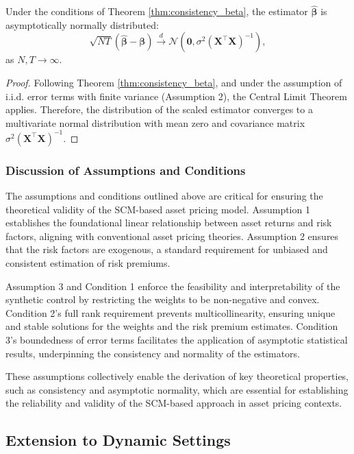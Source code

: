 \begin{corollary}
\label{cor:asymptotic_normality}
Under the conditions of Theorem \ref{thm:consistency_beta}, the estimator $\hat{\boldsymbol{\beta}}$ is asymptotically normally distributed:
\[
\sqrt{NT} (\hat{\boldsymbol{\beta}} - \boldsymbol{\beta}) \xrightarrow{d} \mathcal{N}(\mathbf{0}, \sigma^2 (\mathbf{X}^\top \mathbf{X})^{-1}),
\]
as $N, T \rightarrow \infty$.
\end{corollary}

\begin{proof}
Following Theorem \ref{thm:consistency_beta}, and under the assumption of i.i.d. error terms with finite variance (Assumption 2), the Central Limit Theorem applies. Therefore, the distribution of the scaled estimator converges to a multivariate normal distribution with mean zero and covariance matrix $\sigma^2 (\mathbf{X}^\top \mathbf{X})^{-1}$.
\end{proof}

\subsubsection{Discussion of Assumptions and Conditions}

The assumptions and conditions outlined above are critical for ensuring the theoretical validity of the SCM-based asset pricing model. Assumption 1 establishes the foundational linear relationship between asset returns and risk factors, aligning with conventional asset pricing theories. Assumption 2 ensures that the risk factors are exogenous, a standard requirement for unbiased and consistent estimation of risk premiums.

Assumption 3 and Condition 1 enforce the feasibility and interpretability of the synthetic control by restricting the weights to be non-negative and convex. Condition 2's full rank requirement prevents multicollinearity, ensuring unique and stable solutions for the weights and the risk premium estimates. Condition 3's boundedness of error terms facilitates the application of asymptotic statistical results, underpinning the consistency and normality of the estimators.

These assumptions collectively enable the derivation of key theoretical properties, such as consistency and asymptotic normality, which are essential for establishing the reliability and validity of the SCM-based approach in asset pricing contexts.

\subsection{Extension to Dynamic Settings}

